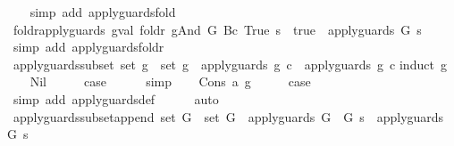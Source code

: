 \begin{isabellebody}
%
\isadelimproof
\ \ %
\endisadelimproof
%
\isatagproof
{}\isamarkupfalse%
\ {\isacharparenleft}simp\ add{\isacharcolon}\ apply{\isacharunderscore}guards{\isacharunderscore}fold{\isacharparenright}%
\endisatagproof
{\isafoldproof}%
%
\isadelimproof
\isanewline
%
\endisadelimproof
\isanewline
{}\isamarkupfalse%
\ foldr{\isacharunderscore}apply{\isacharunderscore}guards{\isacharcolon}\ {\isachardoublequoteopen}{\isacharparenleft}gval\ {\isacharparenleft}foldr\ gAnd\ G\ {\isacharparenleft}Bc\ True{\isacharparenright}{\isacharparenright}\ s\ {\isacharequal}\ true{\isacharparenright}\ {\isacharequal}\ apply{\isacharunderscore}guards\ G\ s{\isachardoublequoteclose}\isanewline
%
\isadelimproof
\ \ %
\endisadelimproof
%
\isatagproof
{}\isamarkupfalse%
\ {\isacharparenleft}simp\ add{\isacharcolon}\ apply{\isacharunderscore}guards{\isacharunderscore}foldr{\isacharparenright}%
\endisatagproof
{\isafoldproof}%
%
\isadelimproof
\isanewline
%
\endisadelimproof
\isanewline
{}\isamarkupfalse%
\ apply{\isacharunderscore}guards{\isacharunderscore}subset{\isacharcolon}\ {\isachardoublequoteopen}set\ g{\isacharprime}\ {\isasymsubseteq}\ set\ g\ {\isasymLongrightarrow}\ apply{\isacharunderscore}guards\ g\ c\ {\isasymlongrightarrow}\ apply{\isacharunderscore}guards\ g{\isacharprime}\ c{\isachardoublequoteclose}\isanewline
%
\isadelimproof
%
\endisadelimproof
%
\isatagproof
{}\isamarkupfalse%
{\isacharparenleft}induct\ g{\isacharparenright}\isanewline
\ \ \isamarkupfalse%
\ Nil\isanewline
\ \ \isamarkupfalse%
\ \isamarkupfalse%
\ {\isacharquery}case\isanewline
\ \ \ \ \isamarkupfalse%
\ simp\isanewline
{}\isamarkupfalse%
\isanewline
\ \ \isamarkupfalse%
\ {\isacharparenleft}Cons\ a\ g{\isacharparenright}\isanewline
\ \ \isamarkupfalse%
\ \isamarkupfalse%
\ {\isacharquery}case\isanewline
\ \ \ \ \isamarkupfalse%
\ {\isacharparenleft}simp\ add{\isacharcolon}\ apply{\isacharunderscore}guards{\isacharunderscore}def{\isacharparenright}\isanewline
\ \ \ \ \isamarkupfalse%
\ auto\isanewline
{}\isamarkupfalse%
%
\endisatagproof
{\isafoldproof}%
%
\isadelimproof
\isanewline
%
\endisadelimproof
\isanewline
{}\isamarkupfalse%
\ apply{\isacharunderscore}guards{\isacharunderscore}subset{\isacharunderscore}append{\isacharcolon}\ {\isachardoublequoteopen}set\ G\ {\isasymsubseteq}\ set\ G{\isacharprime}\ {\isasymLongrightarrow}\ apply{\isacharunderscore}guards\ {\isacharparenleft}G\ {\isacharat}\ G{\isacharprime}{\isacharparenright}\ s\ {\isacharequal}\ apply{\isacharunderscore}guards\ {\isacharparenleft}G{\isacharprime}{\isacharparenright}\ s{\isachardoublequoteclose}\isanewline

\end{isabellebody}
